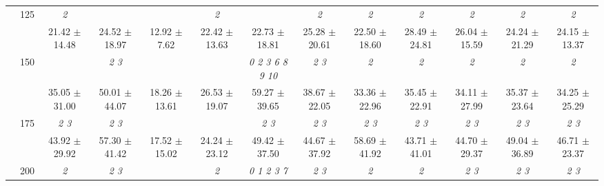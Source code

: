 \begin{table}[h]
{\begin{tabular}{
        ccccccccccccc}
 & \multirow{2}{*}{125}& \cellcolor[HTML]{EFEFEF} \textit{ 2 }& \cellcolor[HTML]{EFEFEF} & \cellcolor[HTML]{EFEFEF} & \cellcolor[HTML]{EFEFEF} \textit{ 2 }& \cellcolor[HTML]{EFEFEF} & \cellcolor[HTML]{EFEFEF} \textit{ 2 }& \cellcolor[HTML]{EFEFEF} \textit{ 2 }& \cellcolor[HTML]{EFEFEF} \textit{ 2 }& \cellcolor[HTML]{EFEFEF} \textit{ 2 }& \cellcolor[HTML]{EFEFEF} \textit{ 2 }& \cellcolor[HTML]{EFEFEF} \textit{ 2 } \\ 
 & & \cellcolor[HTML]{EFEFEF} 21.42 $\pm$ 14.48& \cellcolor[HTML]{EFEFEF} 24.52 $\pm$ 18.97& \cellcolor[HTML]{EFEFEF} 12.92 $\pm$ 7.62& \cellcolor[HTML]{EFEFEF} 22.42 $\pm$ 13.63& \cellcolor[HTML]{EFEFEF} 22.73 $\pm$ 18.81& \cellcolor[HTML]{EFEFEF} 25.28 $\pm$ 20.61& \cellcolor[HTML]{EFEFEF} 22.50 $\pm$ 18.60& \cellcolor[HTML]{EFEFEF} 28.49 $\pm$ 24.81& \cellcolor[HTML]{EFEFEF} 26.04 $\pm$ 15.59& \cellcolor[HTML]{EFEFEF} 24.24 $\pm$ 21.29& \cellcolor[HTML]{EFEFEF} 24.15 $\pm$ 13.37 \\ 
 & \multirow{2}{*}{150}& & \textit{ 2 3 }& & & \textit{  0  2  3  6  8  9 10 }& \textit{ 2 3 }& \textit{ 2 }& \textit{ 2 }& \textit{ 2 }& \textit{ 2 }& \textit{ 2 } \\ 
 & & 35.05 $\pm$ 31.00& 50.01 $\pm$ 44.07& 18.26 $\pm$ 13.61& 26.53 $\pm$ 19.07& 59.27 $\pm$ 39.65& 38.67 $\pm$ 22.05& 33.36 $\pm$ 22.96& 35.45 $\pm$ 22.91& 34.11 $\pm$ 27.99& 35.37 $\pm$ 23.64& 34.25 $\pm$ 25.29 \\ 
 & \multirow{2}{*}{175}& \cellcolor[HTML]{EFEFEF} \textit{ 2 3 }& \cellcolor[HTML]{EFEFEF} \textit{ 2 3 }& \cellcolor[HTML]{EFEFEF} & \cellcolor[HTML]{EFEFEF} & \cellcolor[HTML]{EFEFEF} \textit{ 2 3 }& \cellcolor[HTML]{EFEFEF} \textit{ 2 3 }& \cellcolor[HTML]{EFEFEF} \textit{ 2 3 }& \cellcolor[HTML]{EFEFEF} \textit{ 2 3 }& \cellcolor[HTML]{EFEFEF} \textit{ 2 3 }& \cellcolor[HTML]{EFEFEF} \textit{ 2 3 }& \cellcolor[HTML]{EFEFEF} \textit{ 2 3 } \\ 
 & & \cellcolor[HTML]{EFEFEF} 43.92 $\pm$ 29.92& \cellcolor[HTML]{EFEFEF} 57.30 $\pm$ 41.42& \cellcolor[HTML]{EFEFEF} 17.52 $\pm$ 15.02& \cellcolor[HTML]{EFEFEF} 24.24 $\pm$ 23.12& \cellcolor[HTML]{EFEFEF} 49.42 $\pm$ 37.50& \cellcolor[HTML]{EFEFEF} 44.67 $\pm$ 37.92& \cellcolor[HTML]{EFEFEF} 58.69 $\pm$ 41.92& \cellcolor[HTML]{EFEFEF} 43.71 $\pm$ 41.01& \cellcolor[HTML]{EFEFEF} 44.70 $\pm$ 29.37& \cellcolor[HTML]{EFEFEF} 49.04 $\pm$ 36.89& \cellcolor[HTML]{EFEFEF} 46.71 $\pm$ 23.37 \\ 
 & \multirow{2}{*}{200}& \textit{ 2 }& \textit{ 2 3 }& & \textit{ 2 }& \textit{ 0 1 2 3 7 }& \textit{ 2 3 }& \textit{ 2 }& \textit{ 2 }& \textit{ 2 3 }& \textit{ 2 3 }& \textit{ 2 3 } \\ 

\end{tabular}}
\end{table}
